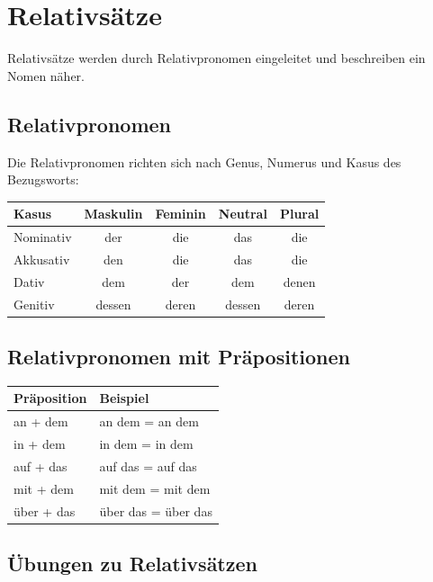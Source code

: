 \chapter{Relativsätze}
\label{cha:Relativ}

Relativsätze werden durch Relativpronomen eingeleitet und beschreiben ein Nomen näher.

\section{Relativpronomen}
\label{sec:Relativpronomen}

Die Relativpronomen richten sich nach Genus, Numerus und Kasus des Bezugsworts:

\begin{center}
\begin{tabular}{|l|c|c|c|c|}
\hline
\textbf{Kasus} & \textbf{Maskulin} & \textbf{Feminin} & \textbf{Neutral} & \textbf{Plural} \\ \hline
Nominativ & der & die & das & die \\ \hline
Akkusativ & den & die & das & die \\ \hline
Dativ & dem & der & dem & denen \\ \hline
Genitiv & dessen & deren & dessen & deren \\ \hline
\end{tabular}
\end{center}

\section{Relativpronomen mit Präpositionen}
\label{sec:RelativPraep}

\begin{center}
\begin{tabular}{|l|l|}
\hline
\textbf{Präposition} & \textbf{Beispiel} \\ \hline
an + dem & an dem = an dem \\ \hline
in + dem & in dem = in dem \\ \hline
auf + das & auf das = auf das \\ \hline
mit + dem & mit dem = mit dem \\ \hline
über + das & über das = über das \\ \hline
\end{tabular}
\end{center}

\section{Übungen zu Relativsätzen}
\label{sec:RelativUebungen}

